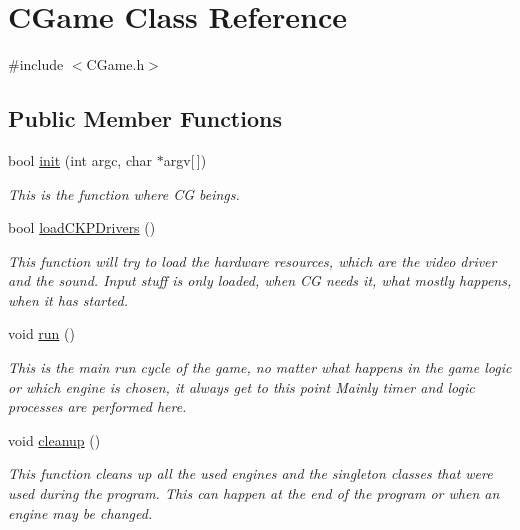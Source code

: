 \hypertarget{class_c_game}{
\section{CGame Class Reference}
\label{class_c_game}
}


{\ttfamily \#include $<$CGame.h$>$}

\subsection*{Public Member Functions}
\begin{DoxyCompactItemize}
\item 
bool \hyperlink{class_c_game_a653ccde97dffc8d499991e14d1f46e8d}{init} (int argc, char $\ast$argv\mbox{[}$\,$\mbox{]})
\begin{DoxyCompactList}\small\item\em This is the function where CG beings. \item\end{DoxyCompactList}\item 
bool \hyperlink{class_c_game_ab95983de4443a6c459c4fe013ec50059}{loadCKPDrivers} ()
\begin{DoxyCompactList}\small\item\em This function will try to load the hardware resources, which are the video driver and the sound. Input stuff is only loaded, when CG needs it, what mostly happens, when it has started. \item\end{DoxyCompactList}\item 
\hypertarget{class_c_game_a90df46f93a7fb0092c8829b2bbf88ef2}{
void \hyperlink{class_c_game_a90df46f93a7fb0092c8829b2bbf88ef2}{run} ()}
\label{class_c_game_a90df46f93a7fb0092c8829b2bbf88ef2}

\begin{DoxyCompactList}\small\item\em This is the main run cycle of the game, no matter what happens in the game logic or which engine is chosen, it always get to this point Mainly timer and logic processes are performed here. \item\end{DoxyCompactList}\item 
\hypertarget{class_c_game_af8baee2b9f5105f2051e39b074ddaab5}{
void \hyperlink{class_c_game_af8baee2b9f5105f2051e39b074ddaab5}{cleanup} ()}
\label{class_c_game_af8baee2b9f5105f2051e39b074ddaab5}

\begin{DoxyCompactList}\small\item\em This function cleans up all the used engines and the singleton classes that were used during the program. This can happen at the end of the program or when an engine may be changed. \item\end{DoxyCompactList}\end{DoxyCompactItemize}
